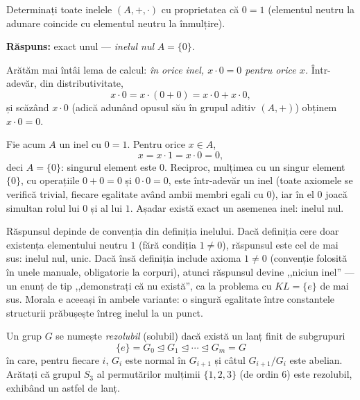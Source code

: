 \begin{problema}
Determinați toate inelele $(A,+,\cdot)$ cu proprietatea că $0=1$
(elementul neutru la adunare coincide cu elementul neutru la înmulțire).
\end{problema}

\noindent\textbf{Răspuns:} exact unul --- \emph{inelul nul} $A=\{0\}$.

\begin{solutie}
Arătăm mai întâi lema de calcul:
\emph{în orice inel, $x\cdot 0=0$ pentru orice $x$.} Într-adevăr,
din distributivitate,
\[
  x\cdot 0=x\cdot(0+0)=x\cdot 0+x\cdot 0 ,
\]
și scăzând $x\cdot 0$ (adică adunând opusul său în
grupul aditiv $(A,+)$) obținem $x\cdot 0=0$.

Fie acum $A$ un inel cu $0=1$. Pentru orice $x\in A$,
\[
  x=x\cdot 1=x\cdot 0=0 ,
\]
deci $A=\{0\}$: singurul element este $0$. Reciproc, mulțimea cu un
singur element $\{0\}$, cu operațiile $0+0=0$ și $0\cdot 0=0$, este
într-adevăr un inel (toate axiomele se verifică trivial, fiecare
egalitate având ambii membri egali cu $0$), iar în el $0$ joacă
simultan rolul lui $0$ și al lui $1$. Așadar există exact un
asemenea inel: inelul nul.
\end{solutie}

\begin{obs}
Răspunsul depinde de convenția din definiția inelului. Dacă
definiția cere doar existența elementului neutru $1$ (fără
condiția $1\neq 0$), răspunsul este cel de mai sus: inelul nul, unic.
Dacă însă definiția include axioma $1\neq 0$ (convenție
folosită în unele manuale, obligatorie la corpuri), atunci răspunsul
devine ,,niciun inel'' --- un enunț de tip ,,demonstrați că nu
există'', ca la problema cu $KL=\{e\}$ de mai sus. Morala e aceeași
în ambele variante: o singură egalitate între constantele
structurii prăbușește întreg inelul la un punct.
\end{obs}

\begin{problema}
Un grup $G$ se numește \emph{rezolubil} (solubil) dacă există un
lanț finit de subgrupuri
\[
  \{e\}=G_{0}\trianglelefteq G_{1}\trianglelefteq\cdots\trianglelefteq G_{m}=G
\]
în care, pentru fiecare $i$, $G_{i}$ este normal în $G_{i+1}$ și
câtul $G_{i+1}/G_{i}$ este abelian. Arătați că grupul $S_{3}$
al permutărilor mulțimii $\{1,2,3\}$ (de ordin $6$) este rezolubil,
exhibând un astfel de lanț.
\end{problema}


